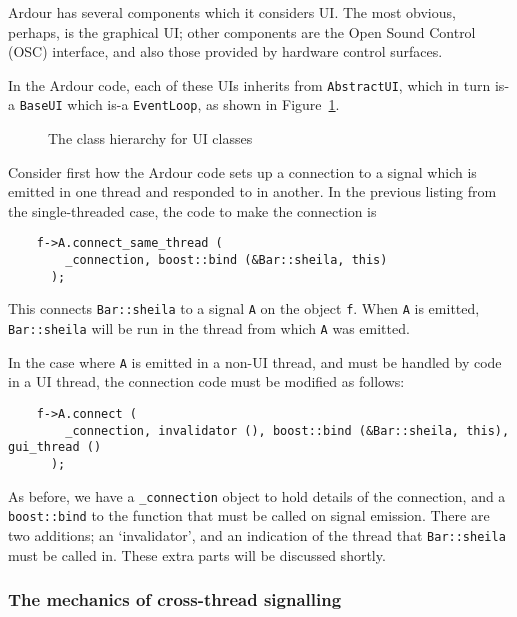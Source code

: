 \documentclass[10pt,a4paper]{book}
\newcommand{\code}[1]{\texttt{#1}}
\begin{document}
Ardour has several components which it considers UI\@.  The most
obvious, perhaps, is the graphical UI; other components are the Open
Sound Control (OSC) interface, and also those provided by hardware
control surfaces.

In the Ardour code, each of these UIs inherits from \code{AbstractUI},
which in turn is-a \code{BaseUI} which is-a \code{EventLoop}, as shown
in Figure~\ref{fig:ui-class-hierarchy}.

\begin{figure}[ht]
\begin{center}

\end{center}
\caption{The class hierarchy for UI classes}
\label{fig:ui-class-hierarchy}
\end{figure}

Consider first how the Ardour code sets up a connection to a signal
which is emitted in one thread and responded to in another.  In the previous
listing from the single-threaded case, the code to make the connection is

\begin{lstlisting}
    f->A.connect_same_thread (
        _connection, boost::bind (&Bar::sheila, this)
      );
\end{lstlisting}

This connects \code{Bar::sheila} to a signal \code{A} on the object
\code{f}.  When \code{A} is emitted, \code{Bar::sheila} will be run in the
thread from which \code{A} was emitted.

In the case where \code{A} is emitted in a non-UI thread, and must be
handled by code in a UI thread, the connection code must be modified as
follows:

\begin{lstlisting}
    f->A.connect (
        _connection, invalidator (), boost::bind (&Bar::sheila, this), gui_thread ()
      );
\end{lstlisting}

As before, we have a \code{\_connection} object to hold details of the connection, and
a \code{boost::bind} to the function that must be called on signal emission.  There
are two additions; an `invalidator', and an indication of the thread that \code{Bar::sheila}
must be called in.  These extra parts will be discussed shortly.

\subsubsection{The mechanics of cross-thread signalling}
\end{document}
